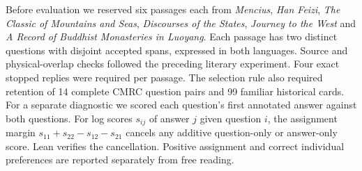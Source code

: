 Before evaluation we reserved six passages each from \emph{Mencius}, \emph{Han Feizi}, \emph{The Classic of Mountains and Seas}, \emph{Discourses of the States}, \emph{Journey to the West} and \emph{A Record of Buddhist Monasteries in Luoyang}. Each passage has two distinct questions with disjoint accepted spans, expressed in both languages. Source and physical-overlap checks followed the preceding literary experiment. Four exact stopped replies were required per passage. The selection rule also required retention of 14 complete CMRC question pairs and 99 familiar historical cards. For a separate diagnostic we scored each question's first annotated answer against both questions. For log scores $s_{ij}$ of answer $j$ given question $i$, the assignment margin $s_{11}+s_{22}-s_{12}-s_{21}$ cancels any additive question-only or answer-only score. Lean verifies the cancellation. Positive assignment and correct individual preferences are reported separately from free reading.
